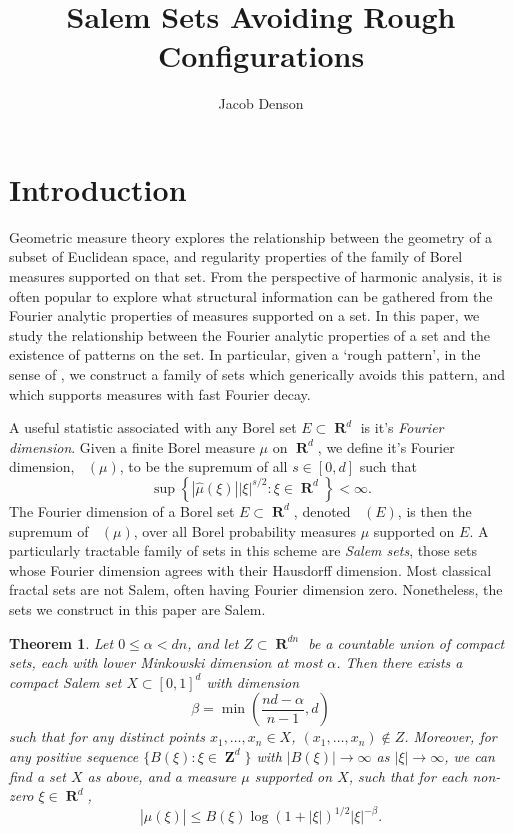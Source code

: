 \documentclass[12pt,reqno]{article}
\title{Salem Sets Avoiding Rough Configurations}
\author{Jacob Denson}
\numberwithin{equation}{section}
\DeclareMathOperator{\fordim}{\dim_{\mathbf{F}}}
\DeclareMathOperator{\RR}{\mathbf{R}}
\DeclareMathOperator{\ZZ}{\mathbf{Z}}
\newtheorem{theorem}{Theorem}
\begin{document}
\maketitle

\section{Introduction}

Geometric measure theory explores the relationship between the geometry of a subset of Euclidean space, and regularity properties of the family of Borel measures supported on that set. From the perspective of harmonic analysis, it is often popular to explore what structural information can be gathered from the Fourier analytic properties of measures supported on a set. In this paper, we study the relationship between the Fourier analytic properties of a set and the existence of patterns on the set. In particular, given a `rough pattern', in the sense of \cite{OurPaper}, we construct a family of sets which generically avoids this pattern, and which supports measures with fast Fourier decay.

A useful statistic associated with any Borel set $E \subset \RR^d$ is it's \emph{Fourier dimension}. Given a finite Borel measure $\mu$ on $\RR^d$, we define it's Fourier dimension, $\fordim(\mu)$, to be the supremum of all $s \in [0,d]$ such that
%
\begin{equation} \label{fordim}
    \sup \left\{ |\widehat{\mu}(\xi)| |\xi|^{s/2} : \xi \in \RR^d \right\} < \infty.
\end{equation}
%
The Fourier dimension of a Borel set $E \subset \RR^d$, denoted $\fordim(E)$, is then the supremum of $\fordim(\mu)$, over all Borel probability measures $\mu$ supported on $E$. A particularly tractable family of sets in this scheme are \emph{Salem sets}, those sets whose Fourier dimension agrees with their Hausdorff dimension. Most classical fractal sets are not Salem, often having Fourier dimension zero. Nonetheless, the sets we construct in this paper are Salem.

\begin{theorem} \label{maintheorem}
    Let $0 \leq \alpha < dn$, and let $Z \subset \RR^{dn}$ be a countable union of compact sets, each with lower Minkowski dimension at most $\alpha$. Then there exists a compact Salem set $X \subset [0,1]^d$ with dimension
    \[ \beta = \min \left( \frac{nd - \alpha}{n-1}, d \right) \]
    such that for any distinct points $x_1, \dots, x_n \in X$, $(x_1, \dots, x_n) \not \in Z$. Moreover, for any positive sequence $\{ B(\xi) : \xi \in \ZZ^d \}$ with $|B(\xi)| \to \infty$ as $|\xi| \to \infty$, we can find a set $X$ as above, and a measure $\mu$ supported on $X$, such that for each non-zero $\xi \in \RR^d$,
    \[ |\widehat{\mu}(\xi)| \leq B(\xi) \log(1 + |\xi|)^{1/2} |\xi|^{-\beta}. \]
\end{theorem}
\end{document}
